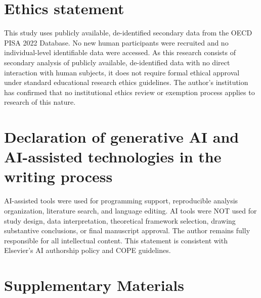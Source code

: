 \documentclass[review,12pt]{elsarticle}
\begin{document}
\section*{Ethics statement}

This study uses publicly available, de-identified secondary data from the OECD PISA 2022 Database. No new human participants were recruited and no individual-level identifiable data were accessed. As this research consists of secondary analysis of publicly available, de-identified data with no direct interaction with human subjects, it does not require formal ethical approval under standard educational research ethics guidelines. The author's institution has confirmed that no institutional ethics review or exemption process applies to research of this nature.

\section*{Declaration of generative AI and AI-assisted technologies in the writing process}

AI-assisted tools were used for programming support, reproducible analysis organization, literature search, and language editing. AI tools were NOT used for study design, data interpretation, theoretical framework selection, drawing substantive conclusions, or final manuscript approval. The author remains fully responsible for all intellectual content. This statement is consistent with Elsevier's AI authorship policy and COPE guidelines.


\FloatBarrier



\clearpage
\section*{Supplementary Materials}











\end{document}
